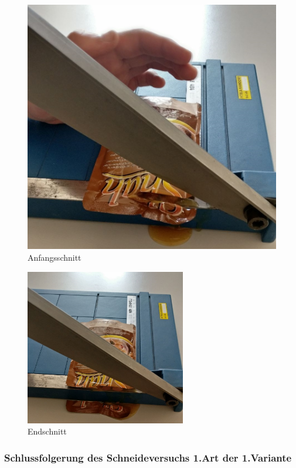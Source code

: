 \begin{figure}[H]
\begin{minipage}[hbt]{.5\linewidth}
      \includegraphics[width=\linewidth]{Bilder/Schneideversuch_1.Art/Anfangsschnitt}
      \caption{Anfangsschnitt}
      \label{Anfangsschnitt} 
   \end{minipage}
\end{figure}

\begin{figure}[H]
\begin{center}
\includegraphics[width=7cm]{Bilder/Schneideversuch_1.Art/Endschnitt}
\caption{Endschnitt}
\label{Endschnitt} 
\end{center}
\end{figure}
\subsubsection{Schlussfolgerung des Schneideversuchs 1.Art der 1.Variante }

